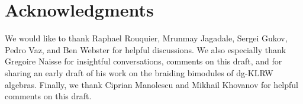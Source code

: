 \documentclass{article}
\begin{document}
\section*{Acknowledgments}
We would like to thank Raphael Rouquier, Mrunmay Jagadale, Sergei Gukov, Pedro Vaz, and Ben Webster for helpful discussions. We also especially thank Gregoire Naisse for insightful conversations, comments on this draft, and for sharing an early draft of his work on the braiding bimodules of dg-KLRW algebras. Finally, we thank Ciprian Manolescu and Mikhail Khovanov for helpful comments on this draft. 



\end{document}
